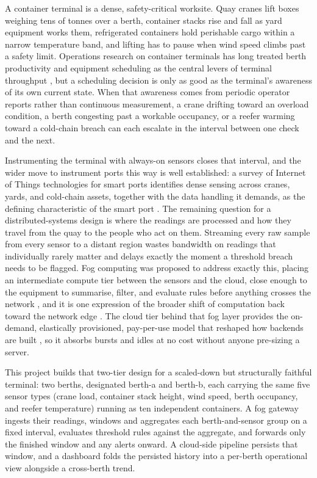 \documentclass[conference]{IEEEtran}
\begin{document}
A container terminal is a dense, safety-critical worksite. Quay cranes lift boxes weighing tens of tonnes over a berth, container stacks rise and fall as yard equipment works them, refrigerated containers hold perishable cargo within a narrow temperature band, and lifting has to pause when wind speed climbs past a safety limit. Operations research on container terminals has long treated berth productivity and equipment scheduling as the central levers of terminal throughput \cite{ref2}, but a scheduling decision is only as good as the terminal's awareness of its own current state. When that awareness comes from periodic operator reports rather than continuous measurement, a crane drifting toward an overload condition, a berth congesting past a workable occupancy, or a reefer warming toward a cold-chain breach can each escalate in the interval between one check and the next.

Instrumenting the terminal with always-on sensors closes that interval, and the wider move to instrument ports this way is well established: a survey of Internet of Things technologies for smart ports identifies dense sensing across cranes, yards, and cold-chain assets, together with the data handling it demands, as the defining characteristic of the smart port \cite{ref1, ref9}. The remaining question for a distributed-systems design is where the readings are processed and how they travel from the quay to the people who act on them. Streaming every raw sample from every sensor to a distant region wastes bandwidth on readings that individually rarely matter and delays exactly the moment a threshold breach needs to be flagged. Fog computing was proposed to address exactly this, placing an intermediate compute tier between the sensors and the cloud, close enough to the equipment to summarise, filter, and evaluate rules before anything crosses the network \cite{ref3, ref10}, and it is one expression of the broader shift of computation back toward the network edge \cite{ref4, ref11}. The cloud tier behind that fog layer provides the on-demand, elastically provisioned, pay-per-use model that reshaped how backends are built \cite{ref5, ref12}, so it absorbs bursts and idles at no cost without anyone pre-sizing a server.

This project builds that two-tier design for a scaled-down but structurally faithful terminal: two berths, designated berth-a and berth-b, each carrying the same five sensor types (crane load, container stack height, wind speed, berth occupancy, and reefer temperature) running as ten independent containers. A fog gateway ingests their readings, windows and aggregates each berth-and-sensor group on a fixed interval, evaluates threshold rules against the aggregate, and forwards only the finished window and any alerts onward. A cloud-side pipeline persists that window, and a dashboard folds the persisted history into a per-berth operational view alongside a cross-berth trend.
\end{document}
